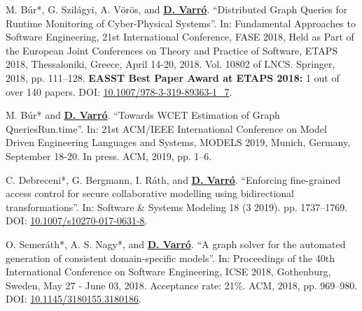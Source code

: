 \begin{yearlist}
\item[\cite{fase2018-cps}] 
M. Búr*, G. Szilágyi, A. Vörös, and \underline{\textbf{D. Varró}}. “Distributed Graph Queries for Runtime Monitoring of Cyber-Physical Systems”. In: Fundamental Approaches to Software Engineering, 21st International Conference, FASE 2018, Held as Part of the European Joint Conferences on Theory and Practice of Software, ETAPS 2018, Thessaloniki, Greece, April 14-20, 2018. Vol. 10802 of LNCS.  Springer, 2018, pp. 111–128. 
\newline \textbf{EASST Best Paper Award at ETAPS 2018:} 1 out of over 140 papers.
\newline DOI: \href{https://doi.org/10.1007/978-3-319-89363-1_7}{10.1007/978-3-319-89363-1\_7}.


\item[\cite{models2019-wcet}] M. Búr* and \underline{\textbf{D. Varró}}. “Towards WCET Estimation of Graph QueriesRun.time”. In: 21st ACM/IEEE International
Conference on Model Driven Engineering Languages and Systems, MODELS 2019, Munich, Germany, September 18-20. In press. ACM, 2019, pp. 1–6.

\item[\cite{sosym2017-mondo}]
C. Debreceni*, G. Bergmann, I. Ráth, and \underline{\textbf{D. Varró}}. “Enforcing fine-grained access control for secure collaborative modelling using bidirectional transformations”. In: Software \& Systems Modeling 18 (3 2019). pp. 1737–1769. 
\newline DOI: \href{https://doi.org/10.1007/s10270-017-0631-8}{10.1007/s10270-017-0631-8}.

\item[\cite{icse2018-solver}] 
O. Semeráth*, A. S. Nagy*, and \underline{\textbf{D. Varró}}. “A graph solver for the automated generation of consistent domain-specific models”. In: Proceedings of the 40th International Conference on Software Engineering, ICSE 2018, Gothenburg, Sweden, May 27 - June 03, 2018. Acceptance rate: 21\%. ACM, 2018, pp. 969–980. 
\newline DOI: \href{https://doi.org/10.1145/3180155.3180186}{10.1145/3180155.3180186}.



\end{yearlist}
